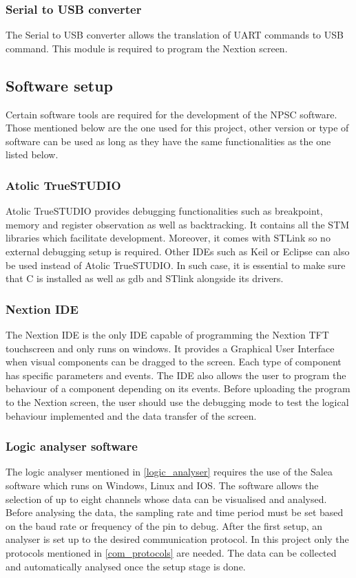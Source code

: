 \subsubsection{Serial to USB converter}
The Serial to USB converter allows the translation of UART commands to USB command. This module is required to program the Nextion screen.
 
\subsection{Software setup}
Certain software tools are required for the development of the NPSC software. Those mentioned below are the one used for this project, other version or type of software can be used as long as they have the same functionalities as the one listed below.
\subsubsection{Atolic TrueSTUDIO}
Atolic TrueSTUDIO provides debugging functionalities such as breakpoint, memory and register observation as well as backtracking. It contains all the STM libraries which facilitate development. Moreover, it comes with STLink so no external debugging setup is required. Other IDEs such as Keil or Eclipse can also be used instead of Atolic TrueSTUDIO. In such case, it is essential to make sure that C is installed as well as gdb and STlink alongside its drivers. 
\subsubsection{Nextion IDE}
The Nextion IDE is the only IDE capable of programming the Nextion TFT touchscreen and only runs on windows. It provides a Graphical User Interface when visual components can be dragged to the screen. Each type of component has specific parameters and events. The IDE also allows the user to program the behaviour of a component depending on its events. Before uploading the program to the Nextion screen, the user should use the debugging mode to test the logical behaviour implemented and the data transfer of the screen.    
\subsubsection{Logic analyser software}
The logic analyser mentioned in \cref{logic_analyser} requires the use of the Salea software which runs on Windows, Linux and IOS. The software allows the selection of up to eight channels whose data can be visualised and analysed. Before analysing the data, the sampling rate and time period must be set based on the baud rate or frequency of the pin to debug. After the first setup, an analyser is set up to the desired communication protocol. In this project only the protocols mentioned in \cref{com_protocols} are needed. The data can be collected and automatically analysed once the setup stage is done.
